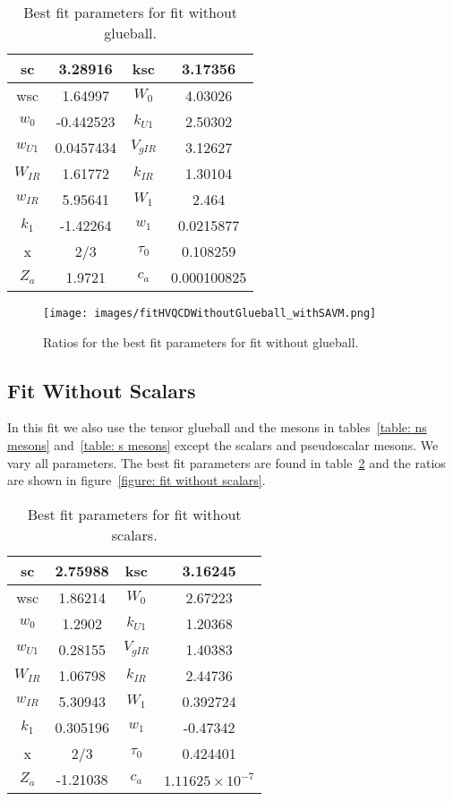 \documentclass[10 pt]{article}
\begin{document}
\begin{table}
\centering
\begin{tabular}{ | c | c | c | c |}
\hline
sc & 3.28916 & ksc & 3.17356 \\
\hline
wsc & 1.64997 & $W_0$ & 4.03026 \\
\hline
$w_0$ & -0.442523 & $k_{U1}$ & 2.50302 \\
\hline
$w_{U1}$ & 0.0457434 & $V_{gIR}$ & 3.12627 \\
\hline
$W_{IR}$ & 1.61772 & $k_{IR}$ & 1.30104 \\
\hline
$w_{IR}$ & 5.95641 & $W_1$ & 2.464 \\
\hline
$k_1$ & -1.42264 & $w_1$ & 0.0215877 \\
\hline
x & 2/3 & $\tau_0$ & 0.108259\\
\hline
$Z_a$ & 1.9721 & $c_a$ & 0.000100825\\
\hline
\end{tabular}
\caption{Best fit parameters for fit without glueball.}
\label{table: fit without glueball parameters} 
\end{table}

\begin{figure}
  \center
  \texttt{[image: images/fitHVQCDWithoutGlueball\_withSAVM.png]} 
  \caption{Ratios for the best fit parameters for fit without glueball.}
  \label{figure: fit without glueball}
\end{figure}


\subsection{Fit Without Scalars}

In this fit we also use the tensor glueball and the mesons in tables~\ref{table: ns mesons} and~\ref{table: s mesons} except the scalars and pseudoscalar mesons. We vary all parameters. The best fit parameters are found in table~\ref{table: fit without scalars parameters} and the ratios are shown in figure~\ref{figure: fit without scalars}.

\begin{table}
\centering
\begin{tabular}{ | c | c | c | c |}
\hline
sc & 2.75988 & ksc & 3.16245 \\
\hline
wsc &1.86214 & $W_0$ & 2.67223 \\
\hline
$w_0$ & 1.2902 & $k_{U1}$ & 1.20368 \\
\hline
$w_{U1}$ & 0.28155 & $V_{gIR}$ & 1.40383 \\
\hline
$W_{IR}$ & 1.06798 & $k_{IR}$ & 2.44736 \\
\hline
$w_{IR}$ & 5.30943 & $W_1$ & 0.392724 \\
\hline
$k_1$ & 0.305196 & $w_1$ & -0.47342 \\
\hline
x & 2/3 & $\tau_0$ & 0.424401\\
\hline
$Z_a$ & -1.21038 & $c_a$ & $1.11625 \times 10^{-7}$ \\
\hline
\end{tabular}
\caption{Best fit parameters for fit without scalars.}
\label{table: fit without scalars parameters} 
\end{table}
\end{document}
